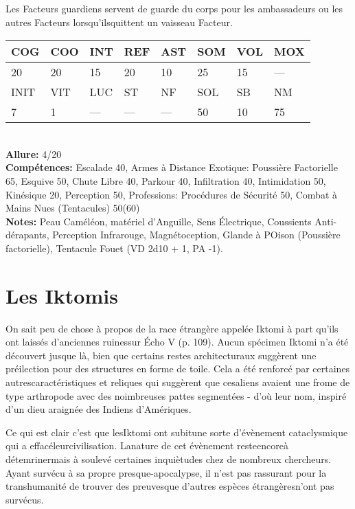 Les Facteurs guardiens servent de guarde du corps pour les ambassadeurs ou les autres Facteurs lorsqu'ilsquittent un vaisseau Facteur. \\ \begin{tabular}{|l|l|l|l|l|l|l|l|} \hline

COG &COO &INT &REF &AST &SOM &VOL &MOX \\ \hline

20 &20 &15 &20 &10 &25 &15 &— \\ \hline

INIT &VIT &LUC &ST &NF &SOL &SB &NM \\ \hline

7 &1 &— &— &— &50 &10 &75 \\ \hline

\end{tabular} \\ \textbf{Allure: }4/20 \\ \textbf{Compétences:} Escalade 40, Armes à Distance Exotique: Poussière Factorielle 65, Esquive 50, Chute Libre 40, Parkour 40, Infiltration 40, Intimidation 50, Kinésique 20, Perception 50, Professions: Procédures de Sécurité 50, Combat à Mains Nues (Tentacules) 50(60) \\ \textbf{Notes:} Peau Caméléon, matériel d'Anguille, Sens Électrique, Coussients Anti-dérapants, Perception Infrarouge, Magnétoception, Glande à POison (Poussière factorielle), Tentacule Fouet (VD 2d10  + 1, PA -1). 

\section{Les Iktomis} 

On sait peu de chose à propos de la race étrangère appelée Iktomi à part qu'ils ont laissés d'anciennes ruinessur Écho V (p. 109). Aucun spécimen Iktomi n'a été découvert jusque là, bien que certains restes architecturaux suggèrent une préilection pour des structures en forme de toile. Cela a été renforcé par certaines autrescaractéristiques et reliques qui suggèrent que cesaliens avaient une frome de type arthropode avec des noimbreuses pattes segmentées - d'où leur nom, inspiré d'un dieu araignée des Indiens d'Amériques. 

Ce qui est clair c'est que lesIktomi ont subitune sorte d'évènement cataclysmique qui a effacéleurcivilisation. Lanature de cet évènement resteencoreà détemrinermais à soulevé certaines inquiètudes chez de nombreux chercheurs. Ayant survécu à sa propre presque-apocalypse, il n'est pas rassurant pour la transhumanité de trouver des preuvesque d'autres espèces étrangèresn'ont pas survécus. 

